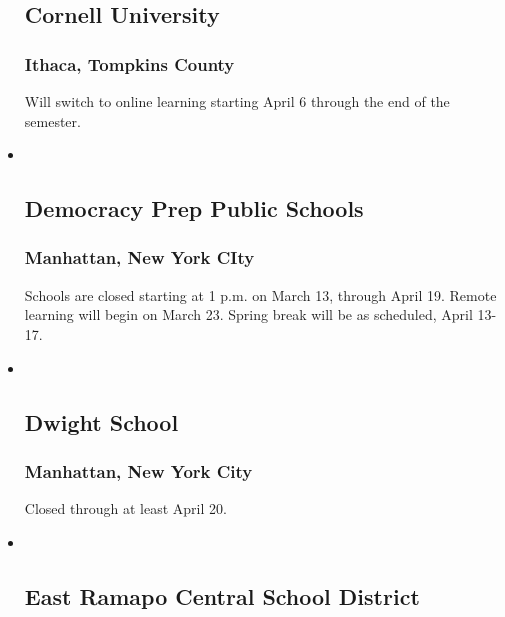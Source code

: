 \begin{itemize}
{  \subsection{Cornell University}\label{cornell-university}}

  \hypertarget{ithaca-tompkins-county}{%
  \subsubsection{Ithaca, Tompkins County}\label{ithaca-tompkins-county}}

  Will switch to online learning starting April 6 through the end of the
  semester.
\item ~
  \hypertarget{democracy-prep-public-schools}{%
  \subsection{Democracy Prep Public
  Schools}\label{democracy-prep-public-schools}}

  \hypertarget{manhattan-new-york-city-4}{%
  \subsubsection{Manhattan, New York
  CIty}\label{manhattan-new-york-city-4}}

  Schools are closed starting at 1 p.m. on March 13, through April 19.
  Remote learning will begin on March 23. Spring break will be as
  scheduled, April 13-17.
\item ~
  \hypertarget{dwight-school}{%
  \subsection{Dwight School}\label{dwight-school}}

  \hypertarget{manhattan-new-york-city-5}{%
  \subsubsection{Manhattan, New York
  City}\label{manhattan-new-york-city-5}}

  Closed through at least April 20.
\item ~
  \hypertarget{east-ramapo-central-school-district}{%
  \subsection{East Ramapo Central School
  District}\label{east-ramapo-central-school-district}}


\end{itemize}
